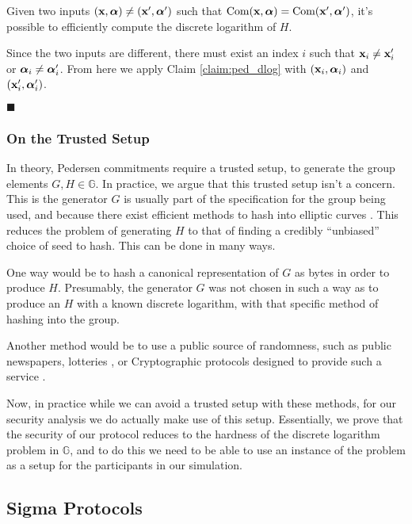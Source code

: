 \begin{claim}
    Given two inputs $(\textbf{x}, \boldsymbol{\alpha}) \neq (\textbf{x}', \boldsymbol{\alpha}')$ such that
    $\text{Com}(\textbf{x}, \boldsymbol{\alpha}) = \text{Com}(\textbf{x}', \boldsymbol{\alpha}')$, it's possible
    to efficiently compute the discrete logarithm of $H$.
\end{claim}

Since the two inputs are different, there must exist an index $i$
such that $\textbf{x}_i \neq \textbf{x}_i'$ or $\boldsymbol{\alpha}_i \neq \boldsymbol{\alpha}_i'$.
From here we apply Claim \ref{claim:ped_dlog} with $(\textbf{x}_i, \boldsymbol{\alpha}_i)$ and
$(\textbf{x}_i', \boldsymbol{\alpha}'_i)$.

$\blacksquare$

\subsubsection{On the Trusted Setup}

In theory, Pedersen commitments require a trusted setup, to generate
the group elements $G, H \in \mathbb{G}$. In practice, we argue that
this trusted setup isn't a concern. This is the generator $G$
is usually part of the specification for the group being used,
and because there exist
efficient methods to hash into elliptic curves \cite{icart_how_2009}.
This reduces the problem of generating $H$ to that of finding a credibly
``unbiased'' choice of seed to hash. This can be done in many ways.

One way would be to hash a canonical representation of $G$ as bytes in order
to produce $H$. Presumably, the generator $G$ was not chosen in such
a way as to produce an $H$ with a known discrete logarithm, with
that specific method of hashing into the group.

Another method would be to use a public source of randomness,
such as public newspapers, lotteries
\cite{baigneres_trap_2015}, or Cryptographic protocols
designed to provide such a service \cite{fischer_public_2011}.

Now, in practice while we can avoid a trusted setup with these methods,
for our security analysis we do actually make use of this setup.
Essentially, we prove that the security of our protocol reduces
to the hardness of the discrete logarithm problem in $\mathbb{G}$,
and to do this we need to be able to use an instance of the problem
as a setup for the participants in our simulation.

\subsection{Sigma Protocols}


